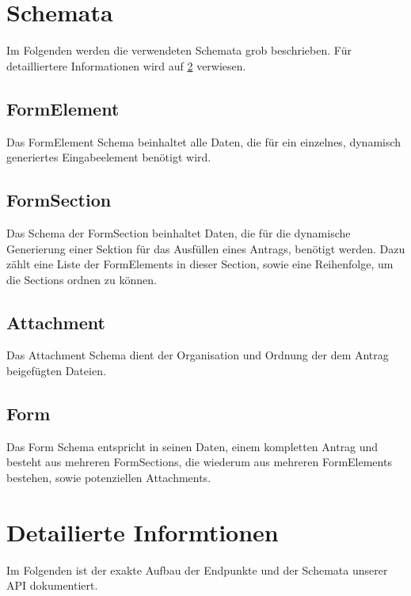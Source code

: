 \section{Schemata}
Im Folgenden werden die verwendeten Schemata grob beschrieben. Für detailliertere Informationen
wird auf \ref{sec:Detailiertere Informationen} verwiesen.

\subsection{FormElement}
Das FormElement Schema beinhaltet alle Daten, die für ein einzelnes, dynamisch generiertes
Eingabeelement benötigt wird.

\subsection{FormSection}
Das Schema der FormSection beinhaltet Daten, die für die dynamische Generierung einer Sektion
für das Ausfüllen eines Antrags, benötigt werden. Dazu zählt eine Liste der FormElements in
dieser Section, sowie eine Reihenfolge, um die Sections ordnen zu können.

\subsection{Attachment}
Das Attachment Schema dient der Organisation und Ordnung der dem Antrag beigefügten Dateien.

\subsection{Form}
Das Form Schema entspricht in seinen Daten, einem kompletten Antrag und besteht aus mehreren
FormSections, die wiederum aus mehreren FormElements bestehen, sowie potenziellen Attachments.

\section{Detailierte Informtionen}\label{sec:Detailiertere Informationen}
Im Folgenden ist der exakte Aufbau der Endpunkte und der Schemata unserer \ac{API} dokumentiert.
